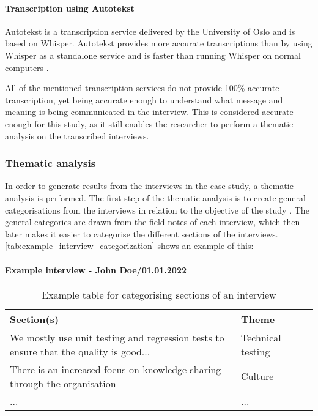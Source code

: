 \paragraph{Transcription using Autotekst}
Autotekst is a transcription service delivered by the University of Oslo and is based on Whisper. Autotekst provides more accurate transcriptions than by using Whisper as a standalone service and is faster than running Whisper on normal computers \cite{autotekst_2023}.

All of the mentioned transcription services do not provide 100\% accurate transcription, yet being accurate enough to understand what message and meaning is being communicated in the interview. This is considered accurate enough for this study, as it still enables the researcher to perform a thematic analysis on the transcribed interviews.

\subsubsection{Thematic analysis}
In order to generate results from the interviews in the case study, a thematic analysis is performed. The first step of the thematic analysis is to create general categorisations from the interviews in relation to the objective of the study \cite{bjo_2022}. The general categories are drawn from the field notes of each interview, which then later makes it easier to categorise the different sections of the interviews. \autoref{tab:example_interview_categorization} shows an example of this:

\paragraph{Example interview - John Doe/01.01.2022} \hspace{0cm}
\begin{table}[H]
\begin{tabular}{|p{0.75\linewidth}|p{0.25\linewidth}|}
\hline
\textbf{Section(s)} & \textbf{Theme} \\ \hline
We mostly use unit testing and regression tests to ensure that the quality is good... & Technical testing \\ \hline
There is an increased focus on knowledge sharing through the organisation & Culture \\ \hline
... & ... \\ \hline
\end{tabular}
\caption{Example table for categorising sections of an interview}
\label{tab:example_interview_categorization}
\end{table}

